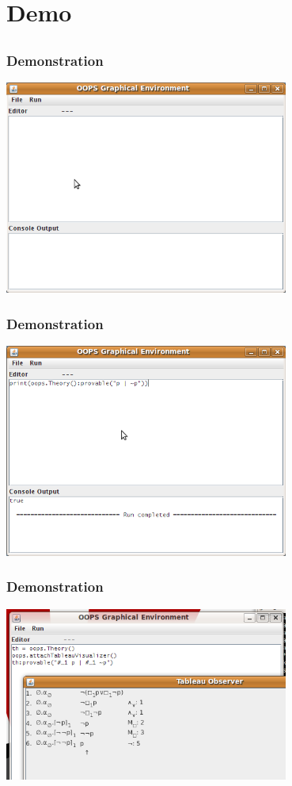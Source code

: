 \documentclass{beamer}
\begin{document}
\section{Demo}
\subsection{}

\begin{frame}
\frametitle{Demonstration}
\includegraphics[width=0.7\textwidth]{demo01}
\end{frame}

\begin{frame}
\frametitle{Demonstration}
\includegraphics[width=0.7\textwidth]{demo02}
\end{frame}

\begin{frame}
\frametitle{Demonstration}
\includegraphics[width=0.7\textwidth]{demo03}
\end{frame}
\end{document}
